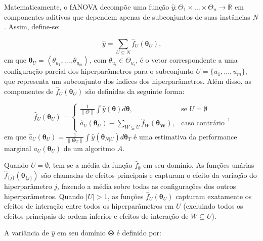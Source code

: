 \documentclass[
  12pt,
  a4paper,
]{scrreprt}
\begin{document}
\vspace{12pt}

Matematicamente, o fANOVA decompõe uma função
\(\hat y: \Theta_{1} \times \dots \times \Theta_{n} \rightarrow \mathbb{R}\)
em componentes aditivos que dependem apenas de subconjuntos de suas
instâncias \(N\). Assim, define-se:

\[
\hat{y} = \sum_{U \subseteq N} \hat{f}_{U} \left(\boldsymbol{\theta}_{U}\right)\text{,}
\] em que
\(\boldsymbol{\theta}_U = \left<\theta_{u_{1}}, \dots, \theta_{u_{m}}\right> \text{, com } \theta_{u_i} \in \Theta_{u_i}\),
é o vetor correspondente a uma configuração parcial dos hiperparâmetros
para o subconjunto \(U = \{u_{1}, \dots, u_{m}\}\), que representa um
subconjunto dos índices dos hiperparâmetros. Além disso, as componentes
de \(\hat{f}_{U} \left(\boldsymbol{\theta}_{U}\right)\) são definidas da
seguinte forma:

\[
\hat{f}_{U} \left(\boldsymbol{\theta}_{U}\right)=
\begin{cases}
  \frac{1}{\|\Theta\|} \int \hat{y} \left(\boldsymbol{\theta}\right) d\boldsymbol{\theta}, & \text{se } U= \emptyset \\
  \hat{a}_{U}\left(\boldsymbol{\theta}_U\right) - \sum_{W \subseteq U} \hat{f}_{W}\left(\boldsymbol{\theta_{W}}\right), & \text{caso contrário}
\end{cases}\text{,}
\] em que
\(\hat{a}_{U}\left(\boldsymbol{\theta}_U\right) = \frac{1}{\|\boldsymbol{\Theta}_{T}\|} \int \hat{y}\left(\boldsymbol{\theta}_{N|U}\right)d \boldsymbol{\theta}_{T}\)
é uma estimativa da performance marginal
\(a_U\left(\boldsymbol{\theta}_U\right)\) de um algoritmo \(A\).

\vspace{12pt}

Quando \(U = \emptyset\), tem-se a média da função
\(\hat{f}_{\emptyset}\) em seu domínio. As funções unárias
\(\hat{f}_{\{j\}}\left(\boldsymbol{\theta}_{\{j\}}\right)\) são chamadas
de efeitos principais e capturam o efeito da variação do hiperparâmetro
\(j\), fazendo a média sobre todas as configurações dos outros
hiperparâmetros. Quando \(|U| > 1\), as funções
\(\hat{f}_{U}\left(\boldsymbol{\theta}_U\right)\) capturam exatamente os
efeitos de interação entre todos os hiperparâmetros em \(U\) (excluindo
todos os efeitos principais de ordem inferior e efeitos de interação de
\(W \subsetneq U\)).

\vspace{12pt}

A variância de \(\hat{y}\) em seu domínio \(\boldsymbol{\Theta}\) é
definido por:
\end{document}
